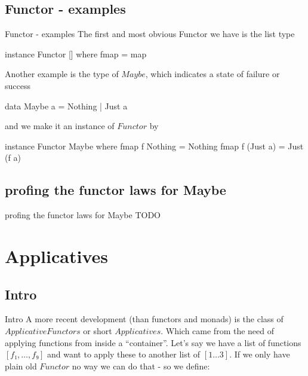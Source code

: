 \documentclass{beamer}
\begin{document}
\subsection{Functor - examples}
\begin{frame}[fragile]{Functor - examples}
The first and most obvious Functor we have is the list type
\begin{code}
    instance Functor [] where
        fmap = map
\end{code}
Another example is the type of $Maybe$, which indicates a state of failure or
success
\begin{code}
    data Maybe a = Nothing | Just a
\end{code}
and we make it an instance of $Functor$ by
\begin{code}
    instance Functor Maybe where
        fmap f Nothing  = Nothing
        fmap f (Just a) = Just (f a)
\end{code}
\end{frame}

\subsection{profing the functor laws for Maybe}
\begin{frame}[fragile]{profing the functor laws for Maybe}
 TODO
\end{frame}

\section{Applicatives} %
\label{sec:applicatives}

\subsection{Intro}
\begin{frame}[fragile]{Intro}
A more recent development (than functors and monads) is the class of
$Applicative Functors$ or short $Applicatives$. Which came from the need
of applying functions from inside a “container”. Let's say we have a list of
functions $[f₁,…,f₉]$ and want to apply these to another list of $[1…3]$.
If we only have plain old $Functor$ no way we can do that - so we define:
\end{frame}
\end{document}
